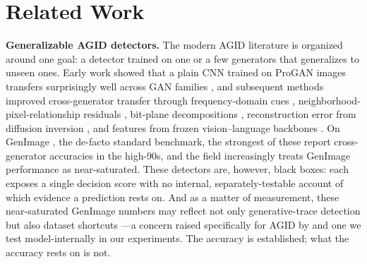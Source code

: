 \section{Related Work}

\textbf{Generalizable AGID detectors.} The modern AGID literature is organized around one goal: a detector trained on one or a few generators that generalizes to unseen ones. Early work showed that a plain CNN trained on ProGAN images transfers surprisingly well across GAN families \citep{wang2020cnngenerated}, and subsequent methods improved cross-generator transfer through frequency-domain cues \citep{frank2020dctgan, durall2020watch, tan2024freqnet}, neighborhood-pixel-relationship residuals \citep{tan2024npr}, bit-plane decompositions \citep{wang2025lota}, reconstruction error from diffusion inversion \citep{wang2023dire}, and features from frozen vision--language backbones \citep{ojha2023universal}. On GenImage \citep{zhu2023genimage}, the de-facto standard benchmark, the strongest of these report cross-generator accuracies in the high-90s, and the field increasingly treats GenImage performance as near-saturated. These detectors are, however, black boxes: each exposes a single decision score with no internal, separately-testable account of which evidence a prediction rests on. And as a matter of measurement, these near-saturated GenImage numbers may reflect not only generative-trace detection but also dataset shortcuts \citep{geirhos2020shortcut}---a concern raised specifically for AGID by \citet{grommelt2024fakejpeg} and one we test model-internally in our experiments. The accuracy is established; what the accuracy rests on is not.

